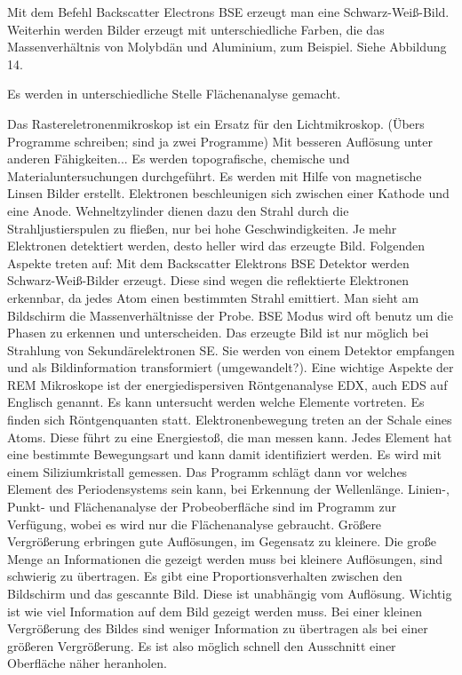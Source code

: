 	Mit dem Befehl Backscatter Electrons BSE erzeugt man eine Schwarz-Weiß-Bild. Weiterhin werden Bilder erzeugt mit unterschiedliche Farben, die das Massenverhältnis von Molybdän und Aluminium, zum Beispiel. Siehe Abbildung 14.
	
	Es werden in unterschiedliche Stelle Flächenanalyse gemacht. 

Das Rastereletronenmikroskop ist ein Ersatz für den Lichtmikroskop. (Übers Programme schreiben; sind ja zwei Programme) Mit besseren Auflösung unter anderen Fähigkeiten... Es werden topografische, chemische und Materialuntersuchungen durchgeführt. Es werden mit Hilfe von magnetische Linsen Bilder erstellt. Elektronen beschleunigen sich zwischen einer Kathode und eine Anode. Wehneltzylinder dienen dazu den Strahl durch die Strahljustierspulen zu fließen, nur bei hohe Geschwindigkeiten. Je mehr Elektronen detektiert werden, desto heller wird das erzeugte Bild.
Folgenden Aspekte treten auf:
Mit dem Backscatter Elektrons BSE Detektor werden Schwarz-Weiß-Bilder erzeugt. Diese sind wegen die reflektierte Elektronen erkennbar, da jedes Atom einen bestimmten Strahl emittiert. Man sieht am Bildschirm die Massenverhältnisse der Probe. BSE Modus wird oft benutz um die Phasen zu erkennen und unterscheiden.
Das erzeugte Bild ist nur möglich bei Strahlung von Sekundärelektronen SE. Sie werden von einem Detektor empfangen und als Bildinformation transformiert (umgewandelt?). 
Eine wichtige Aspekte der REM Mikroskope ist der energiedispersiven Röntgenanalyse EDX, auch EDS auf Englisch genannt. Es kann untersucht werden welche Elemente vortreten. Es finden sich Röntgenquanten statt. Elektronenbewegung treten an der Schale eines Atoms. Diese führt zu eine Energiestoß, die man messen kann. Jedes Element hat eine bestimmte Bewegungsart und kann damit identifiziert werden. Es wird mit einem Siliziumkristall gemessen. Das Programm schlägt dann vor welches Element des Periodensystems sein kann, bei Erkennung der Wellenlänge. 
Linien-, Punkt- und Flächenanalyse der Probeoberfläche sind im Programm zur Verfügung, wobei es wird nur die Flächenanalyse gebraucht. 
Größere Vergrößerung erbringen gute Auflösungen, im Gegensatz zu kleinere. Die große Menge an Informationen die gezeigt werden muss bei kleinere Auflösungen, sind schwierig zu übertragen. Es gibt eine Proportionsverhalten zwischen den Bildschirm und das gescannte Bild. Diese ist unabhängig vom Auflösung. Wichtig ist wie viel Information auf dem Bild gezeigt werden muss.  Bei einer kleinen Vergrößerung des Bildes sind weniger Information zu übertragen als bei einer größeren Vergrößerung. Es ist also möglich schnell den Ausschnitt einer Oberfläche näher heranholen.

